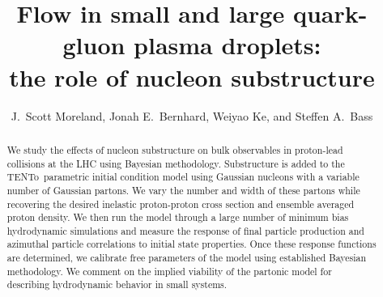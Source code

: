 \documentclass[3p,times,procedia]{elsarticle}
\newcommand{\trento}{T\raisebox{-0.3ex}{R}ENTo}
\begin{document}
\begin{frontmatter}



\dochead{}

\title{Flow in small and large quark-gluon plasma droplets:\\the role of nucleon substructure}

\author{J.\ Scott Moreland, Jonah E.\ Bernhard, Weiyao Ke, and Steffen A.\ Bass}
\address{Department of Physics, Duke University, Durham, NC 27708-0305}

\begin{abstract}
We study the effects of nucleon substructure on bulk observables in proton-lead collisions at the LHC using Bayesian methodology. Substructure is added to the \trento\ parametric initial condition model using Gaussian nucleons with a variable number of Gaussian partons. We vary the number and width of these partons while recovering the desired inelastic proton-proton cross section and ensemble averaged proton density. We then run the model through a large number of minimum bias hydrodynamic simulations and measure the response of final particle production and azimuthal particle correlations to initial state properties. Once these response functions are determined, we calibrate free parameters of the model using established Bayesian methodology. We comment on the implied viability of the partonic model for describing hydrodynamic behavior in small systems.
\end{abstract}


\end{frontmatter}
\end{document}
